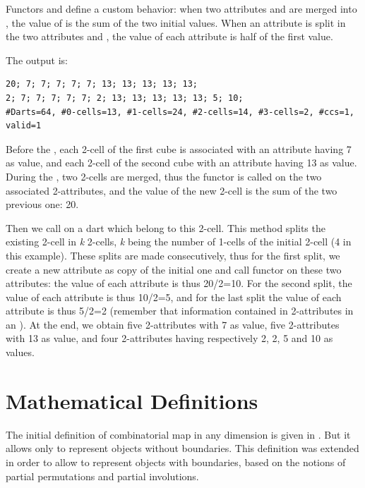 Functors  and  define a
custom behavior: when two attributes  and  are
merged into , the value of  is the sum of the
two initial values.  When an attribute  is split in the two
attributes  and , the value of each attribute is
half of the first value.


The output is:
\begin{verbatim}
20; 7; 7; 7; 7; 7; 13; 13; 13; 13; 13; 
2; 7; 7; 7; 7; 7; 2; 13; 13; 13; 13; 13; 5; 10; 
#Darts=64, #0-cells=13, #1-cells=24, #2-cells=14, #3-cells=2, #ccs=1, valid=1
\end{verbatim}

Before the , each 2-cell of the first cube is
associated with an attribute having 7 as value, and each 2-cell of the
second cube with an attribute having 13 as value. During the
, two 2-cells are merged, thus the functor
 is called on the two associated 2-attributes, and
the value of the new 2-cell is the sum of the two previous one: 20.

Then we call  on a dart which
belong to this 2-cell. This method splits the existing 2-cell in \emph{k}
2-cells, \emph{k} being the number of 1-cells of the initial 2-cell (4 in
this example). These splits are made consecutively, thus for the first
split, we create a new attribute as copy of the initial one and call
functor  on these two attributes: the value
of each attribute is thus 20/2=10. For the second split, the value of
each attribute is thus 10/2=5, and for the last split the value of
each attribute is thus 5/2=2 (remember that information contained in
2-attributes in an ).  At the end, we obtain five
2-attributes with 7 as value, five 2-attributes with 13 as value, and
four 2-attributes having respectively 2, 2, 5 and 10 as values.

\section{Mathematical Definitions}\label{sec_definition}

The initial definition of combinatorial map in any dimension is given
in \cite{cgal:l-tmbrc-91,l-ndgcm-94}. But it allows only to represent
objects without boundaries. This definition was extended
\cite{cgal:pabl-cco-07,cgal:d-ccccg-10} in order to allow to represent 
objects with boundaries, based on the notions of partial permutations 
and partial involutions.

